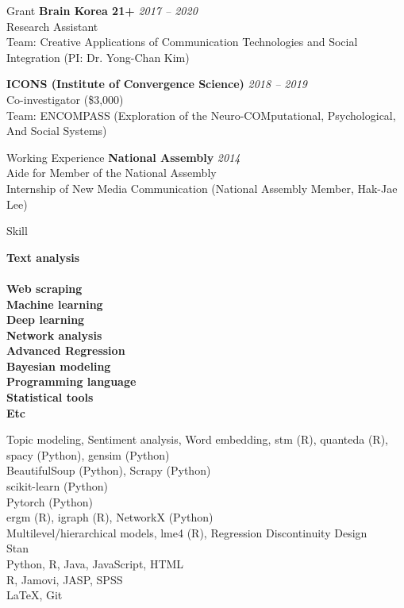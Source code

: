\documentclass{resume} %
\begin{document}
\begin{rSection}{Grant}
{\bf Brain Korea 21+} \hfill {\em 2017 -- 2020}\\
Research Assistant\\
Team: Creative Applications of Communication Technologies and Social Integration (PI: Dr. Yong-Chan Kim)

{\bf ICONS (Institute of Convergence Science)} \hfill {\em 2018 -- 2019}\\
Co-investigator (\$3,000)\\
Team: ENCOMPASS (Exploration of the Neuro-COMputational, Psychological, And Social Systems)
\end{rSection}


\begin{rSection}{Working Experience}
{\bf National Assembly} \hfill {\em 2014}\\
Aide for Member of the National Assembly\\
Internship of New Media Communication (National Assembly Member, Hak-Jae Lee)
\end{rSection}


\begin{rSection}{Skill}
\begin{minipage}[t]{.25\textwidth}
{\bf Text analysis\\ \\Web scraping \\Machine learning \\ Deep learning \\ Network analysis\\Advanced Regression\\ Bayesian modeling\\Programming language\\Statistical tools\\Etc}
\end{minipage}
\begin{minipage}[t]{.70\textwidth}
Topic modeling, Sentiment analysis, Word embedding, stm (R), quanteda (R), spacy (Python), gensim (Python)\\ BeautifulSoup (Python), Scrapy (Python)\\ scikit-learn (Python) \\ Pytorch (Python) \\ ergm (R), igraph (R), NetworkX (Python)\\Multilevel/hierarchical models, lme4 (R), Regression Discontinuity Design\\ Stan \\Python, R, Java, JavaScript, HTML\\R, Jamovi, JASP, SPSS\\\LaTeX, Git
\end{minipage}

\end{rSection}
\end{document}
